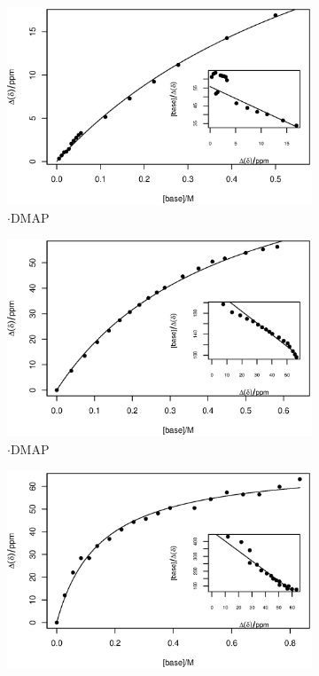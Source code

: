 \begin{refsection}
\begin{figure}
  \centering
  \begin{subfigure}{0.45\linewidth}
    \includegraphics[width=\linewidth]{Figures/nmr-titration/bn-ebs-dmap.eps}
    \caption{$\cdot$DMAP}
  \end{subfigure}
  \begin{subfigure}{0.45\linewidth}
    \includegraphics[width=\linewidth]{Figures/nmr-titration/4oet-ebs-dmap.eps}
    \caption{$\cdot$DMAP}
  \end{subfigure}
  \begin{subfigure}{0.45\linewidth}
    \includegraphics[width=\linewidth]{Figures/nmr-titration/ebs-dmap.eps}

\end{subfigure}
\end{figure}
\end{refsection}
